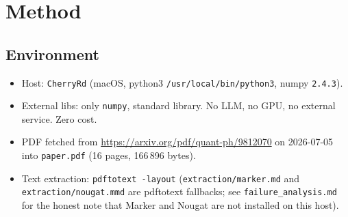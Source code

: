 \documentclass[11pt]{article}
\begin{document}
\section{Method}

\subsection{Environment}
\begin{itemize}
  \item Host: \texttt{CherryRd} (macOS, python3 \texttt{/usr/local/bin/python3}, numpy \texttt{2.4.3}).
  \item External libs: only \texttt{numpy}, standard library. No LLM,
        no GPU, no external service. Zero cost.
  \item PDF fetched from \url{https://arxiv.org/pdf/quant-ph/9812070} on
        2026-07-05 into \texttt{paper.pdf} (16 pages, 166\,896 bytes).
  \item Text extraction: \texttt{pdftotext -layout} (\texttt{extraction/marker.md}
        and \texttt{extraction/nougat.mmd} are pdftotext fallbacks; see
        \texttt{failure\_analysis.md} for the honest note that Marker and
        Nougat are not installed on this host).
\end{itemize}
\end{document}
